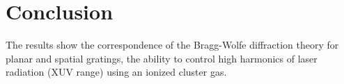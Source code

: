 \documentclass[conference]{IEEEtran}
\begin{document}

\section*{Conclusion}

The results show the correspondence of the Bragg-Wolfe diffraction theory for planar and spatial gratings, the ability to control high harmonics of laser radiation (XUV range) using an ionized cluster gas.





\end{document}
